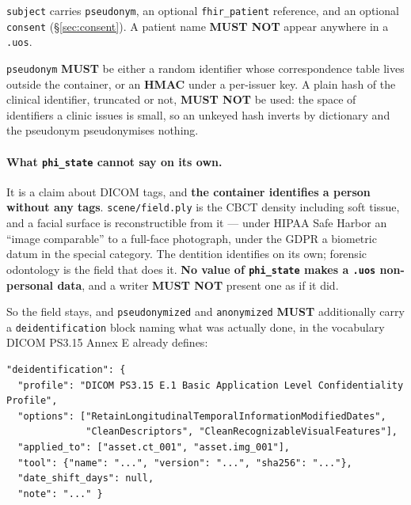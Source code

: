\documentclass[11pt,a4paper]{article}
\newcommand{\MUST}{\textcolor{uosred}{\textbf{MUST}}}
\newcommand{\MUSTNOT}{\textcolor{uosred}{\textbf{MUST NOT}}}
\newcommand{\code}[1]{\texttt{\small #1}}
\begin{document}
\code{subject} carries \code{pseudonym}, an optional \code{fhir\_patient} reference, and an
optional \code{consent} (\S\ref{sec:consent}). A patient name \MUSTNOT{} appear anywhere in
a \code{.uos}.

\code{pseudonym} \MUST{} be either a random identifier whose correspondence table lives
outside the container, or an \textbf{HMAC} under a per-issuer key. A plain hash of the
clinical identifier, truncated or not, \MUSTNOT{} be used: the space of identifiers a
clinic issues is small, so an unkeyed hash inverts by dictionary and the pseudonym
pseudonymises nothing.

\paragraph{What \code{phi\_state} cannot say on its own.}
It is a claim about DICOM tags, and \textbf{the container identifies a person without any
tags}. \code{scene/field.ply} is the CBCT density including soft tissue, and a facial
surface is reconstructible from it --- under HIPAA Safe Harbor an ``image comparable'' to a
full-face photograph, under the GDPR a biometric datum in the special category. The
dentition identifies on its own; forensic odontology is the field that does it. \textbf{No
value of \code{phi\_state} makes a \code{.uos} non-personal data}, and a writer \MUSTNOT{}
present one as if it did.

So the field stays, and \code{pseudonymized} and \code{anonymized} \MUST{} additionally
carry a \code{deidentification} block naming what was actually done, in the vocabulary
DICOM PS3.15 Annex E already defines:

\begin{lstlisting}[style=js]
"deidentification": {
  "profile": "DICOM PS3.15 E.1 Basic Application Level Confidentiality Profile",
  "options": ["RetainLongitudinalTemporalInformationModifiedDates",
              "CleanDescriptors", "CleanRecognizableVisualFeatures"],
  "applied_to": ["asset.ct_001", "asset.img_001"],
  "tool": {"name": "...", "version": "...", "sha256": "..."},
  "date_shift_days": null,
  "note": "..." }
\end{lstlisting}
\end{document}
